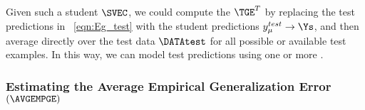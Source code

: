 Given such a student $\SVEC$, we could compute the \Teacher \GeneralizationError $\TGE^{T}$ by
replacing the test predictions in \EQN~\ref{eqn:Eg_test} with the student predictions
$y_{\mu}^{test}\rightarrow \Ys$, and then average directly over the test data $\DATAtest$
for all possible or available test examples.
In this way, we can model test predictions using one or more \Student \Perceptrons.



\subsubsection{Estimating the Average Empirical Generalization Error $(\AVGEMPGE)$}

